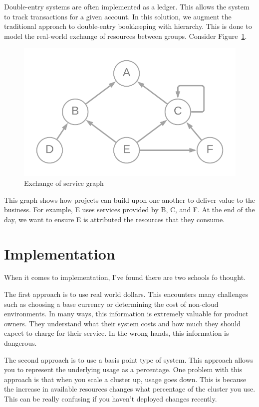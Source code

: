 \documentclass[10pt, a4paper, twocolumn]{article}
\begin{document}
    Double-entry systems are often implemented as a ledger.
    This allows the system to track transactions for a given account.
    In this solution, we augment the traditional approach to double-entry bookkeeping with hierarchy.
    This is done to model the real-world exchange of resources between groups.
    Consider Figure~\ref{figure:2}.

    \begin{figure}[H]
      \centering
      \includegraphics[width=\linewidth]{./cost-attribution-graph.png}
      \caption{Exchange of service graph}
      \label{figure:2}
    \end{figure}

    This graph shows how projects can build upon one another to deliver value to the business.
    For example, E uses services provided by B, C, and F.
    At the end of the day, we want to ensure E is attributed the resources that they consume.

\section*{Implementation}
  When it comes to implementation, I've found there are two schools fo thought.

  The first approach is to use real world dollars.
  This encounters many challenges such as choosing a base currency or determining the cost of non-cloud environments.
  In many ways, this information is extremely valuable for product owners.
  They understand what their system costs and how much they should expect to charge for their service.
  In the wrong hands, this information is dangerous.

  The second approach is to use a basis point type of system.
  This approach allows you to represent the underlying usage as a percentage.
  One problem with this approach is that when you scale a cluster up, usage goes down.
  This is because the increase in available resources changes what percentage of the cluster you use.
  This can be really confusing if you haven't deployed changes recently.
\end{document}
